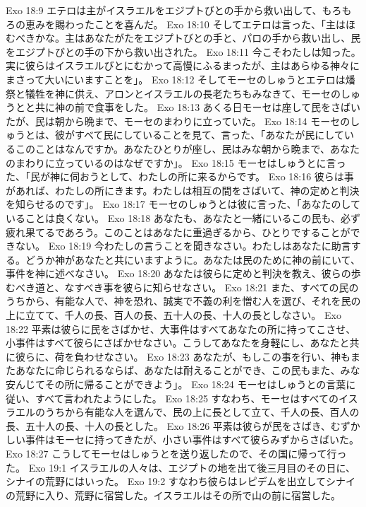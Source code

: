 Exo 18:9  エテロは主がイスラエルをエジプトびとの手から救い出して、もろもろの恵みを賜わったことを喜んだ。
Exo 18:10  そしてエテロは言った、「主はほむべきかな。主はあなたがたをエジプトびとの手と、パロの手から救い出し、民をエジプトびとの手の下から救い出された。
Exo 18:11  今こそわたしは知った。実に彼らはイスラエルびとにむかって高慢にふるまったが、主はあらゆる神々にまさって大いにいますことを」。
Exo 18:12  そしてモーセのしゅうとエテロは燔祭と犠牲を神に供え、アロンとイスラエルの長老たちもみなきて、モーセのしゅうとと共に神の前で食事をした。
Exo 18:13  あくる日モーセは座して民をさばいたが、民は朝から晩まで、モーセのまわりに立っていた。
Exo 18:14  モーセのしゅうとは、彼がすべて民にしていることを見て、言った、「あなたが民にしているこのことはなんですか。あなたひとりが座し、民はみな朝から晩まで、あなたのまわりに立っているのはなぜですか」。
Exo 18:15  モーセはしゅうとに言った、「民が神に伺おうとして、わたしの所に来るからです。
Exo 18:16  彼らは事があれば、わたしの所にきます。わたしは相互の間をさばいて、神の定めと判決を知らせるのです」。
Exo 18:17  モーセのしゅうとは彼に言った、「あなたのしていることは良くない。
Exo 18:18  あなたも、あなたと一緒にいるこの民も、必ず疲れ果てるであろう。このことはあなたに重過ぎるから、ひとりですることができない。
Exo 18:19  今わたしの言うことを聞きなさい。わたしはあなたに助言する。どうか神があなたと共にいますように。あなたは民のために神の前にいて、事件を神に述べなさい。
Exo 18:20  あなたは彼らに定めと判決を教え、彼らの歩むべき道と、なすべき事を彼らに知らせなさい。
Exo 18:21  また、すべての民のうちから、有能な人で、神を恐れ、誠実で不義の利を憎む人を選び、それを民の上に立てて、千人の長、百人の長、五十人の長、十人の長としなさい。
Exo 18:22  平素は彼らに民をさばかせ、大事件はすべてあなたの所に持ってこさせ、小事件はすべて彼らにさばかせなさい。こうしてあなたを身軽にし、あなたと共に彼らに、荷を負わせなさい。
Exo 18:23  あなたが、もしこの事を行い、神もまたあなたに命じられるならば、あなたは耐えることができ、この民もまた、みな安んじてその所に帰ることができよう」。
Exo 18:24  モーセはしゅうとの言葉に従い、すべて言われたようにした。
Exo 18:25  すなわち、モーセはすべてのイスラエルのうちから有能な人を選んで、民の上に長として立て、千人の長、百人の長、五十人の長、十人の長とした。
Exo 18:26  平素は彼らが民をさばき、むずかしい事件はモーセに持ってきたが、小さい事件はすべて彼らみずからさばいた。
Exo 18:27  こうしてモーセはしゅうとを送り返したので、その国に帰って行った。
Exo 19:1  イスラエルの人々は、エジプトの地を出て後三月目のその日に、シナイの荒野にはいった。
Exo 19:2  すなわち彼らはレピデムを出立してシナイの荒野に入り、荒野に宿営した。イスラエルはその所で山の前に宿営した。
